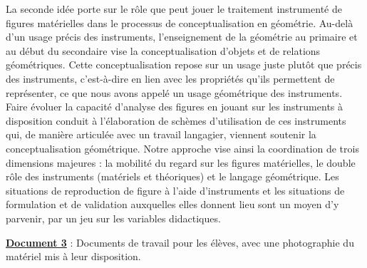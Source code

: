 \begin{center}
\begin{minipage}{16cm}
{La seconde idée porte sur le rôle que peut jouer le traitement instrumenté de figures matérielles dans le processus de conceptualisation en géométrie. Au-delà d’un usage précis des instruments, l’enseignement de la géométrie au primaire et au début du secondaire vise la conceptualisation d’objets et de relations géométriques. Cette conceptualisation repose sur un usage juste plutôt que précis des instruments, c’est-à-dire en lien avec les propriétés qu’ils permettent de représenter, ce que nous avons appelé un usage géométrique des instruments. Faire évoluer la capacité d’analyse des figures en jouant sur les instruments à disposition conduit à l’élaboration de schèmes d’utilisation de ces instruments qui, de manière articulée avec un travail langagier, viennent soutenir la conceptualisation géométrique. Notre approche vise ainsi la coordination de trois dimensions majeures : la mobilité du regard sur les figures matérielles, le double rôle des instruments (matériels et théoriques) et le langage géométrique. Les situations de reproduction de figure à l’aide d’instruments et les situations de formulation et de validation auxquelles elles donnent lieu sont un moyen d’y parvenir, par un jeu sur les variables didactiques.
      }
   \end{minipage}
\end{center}

\bigskip

{\bf\uline{Document 3}} : Documents de travail pour les élèves, avec une photographie du matériel mis à leur disposition.

\begin{center}
\end{center}

